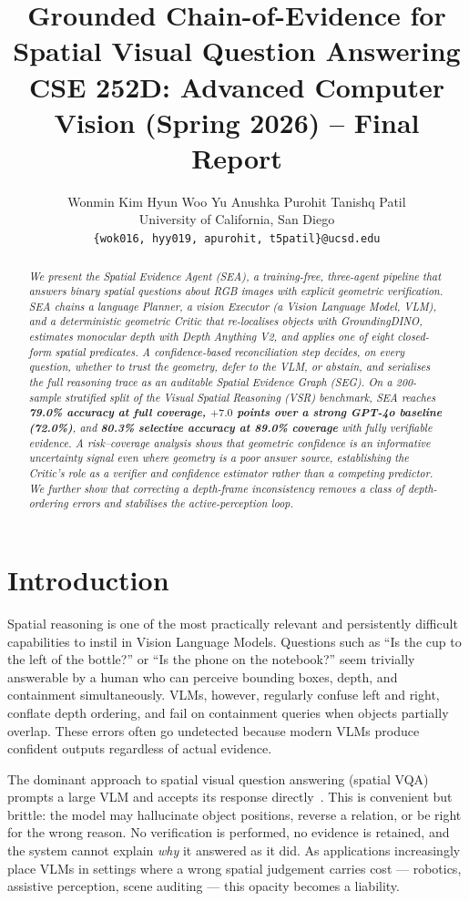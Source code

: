 \documentclass[10pt,twocolumn,letterpaper]{article}
\title{\vspace{-2.5em}\textbf{\Large Grounded Chain-of-Evidence for Spatial Visual Question Answering}\\[0.3em]
{\normalsize CSE 252D: Advanced Computer Vision (Spring 2026) -- Final Report}}
\author{
Wonmin Kim \quad Hyun Woo Yu \quad Anushka Purohit \quad Tanishq Patil\\
University of California, San Diego\\
{\small\texttt{\{wok016, hyy019, apurohit, t5patil\}@ucsd.edu}}
}
\date{}
\begin{document}
\maketitle

\begin{abstract}
\textit{We present the Spatial Evidence Agent (SEA), a training-free,
three-agent pipeline that answers binary spatial questions about RGB images
with explicit geometric verification. SEA chains a language Planner, a vision
Executor (a Vision Language Model, VLM), and a deterministic geometric Critic
that re-localises objects with GroundingDINO, estimates monocular depth with
Depth Anything V2, and applies one of eight closed-form spatial predicates. A
confidence-based reconciliation step decides, on every question, whether to
trust the geometry, defer to the VLM, or abstain, and serialises the full
reasoning trace as an auditable Spatial Evidence Graph (SEG). On a 200-sample
stratified split of the Visual Spatial Reasoning (VSR) benchmark, SEA reaches
\textbf{79.0\% accuracy at full coverage, $+7.0$ points over a strong GPT-4o
baseline (72.0\%)}, and \textbf{80.3\% selective accuracy at 89.0\% coverage}
with fully verifiable evidence. A risk--coverage analysis shows that geometric
confidence is an informative uncertainty signal even where geometry is a poor
answer source, establishing the Critic's role as a verifier and confidence
estimator rather than a competing predictor. We further show that correcting a
depth-frame inconsistency removes a class of depth-ordering errors and
stabilises the active-perception loop.}
\end{abstract}

\section{Introduction}
Spatial reasoning is one of the most practically relevant and persistently
difficult capabilities to instil in Vision Language Models. Questions such as
``Is the cup to the left of the bottle?'' or ``Is the phone on the
notebook?'' seem trivially answerable by a human who can perceive bounding
boxes, depth, and containment simultaneously. VLMs, however, regularly confuse
left and right, conflate depth ordering, and fail on containment queries when
objects partially overlap. These errors often go undetected because modern
VLMs produce confident outputs regardless of actual evidence.

The dominant approach to spatial visual question answering (spatial VQA)
prompts a large VLM and accepts its response directly~\cite{llava}. This is
convenient but brittle: the model may hallucinate object positions, reverse a
relation, or be right for the wrong reason. No verification is performed, no
evidence is retained, and the system cannot explain \emph{why} it answered as
it did. As applications increasingly place VLMs in settings where a wrong
spatial judgement carries cost --- robotics, assistive perception, scene
auditing --- this opacity becomes a liability.
\end{document}
